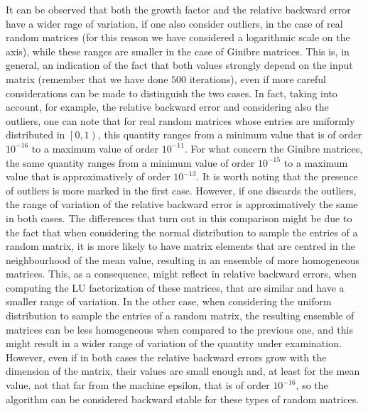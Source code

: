 \documentclass[a4paper,11pt]{report}
\begin{document}
\noindent It can be observed that both the growth factor and the relative backward error have a wider rage of variation, if one also consider outliers, in the case of real random matrices (for this reason we have considered a logarithmic scale on the axis), while these ranges are smaller in the case of Ginibre matrices. This is, in general, an indication of the fact that both values strongly depend on the input matrix (remember that we have done $500$ iterations), even if more careful considerations can be made to distinguish the two cases. In fact, taking into account, for example, the relative backward error and considering also the outliers, one can note that for real random matrices whose entries are uniformly distributed in $\left[0,1\right)$, this quantity ranges from a minimum value that is of order $10^{-16}$ to a maximum value of order $10^{-11}$. For what concern the Ginibre matrices, the same quantity ranges from a minimum value of order $10^{-15}$ to a maximum value that is approximatively of order $10^{-13}$. It is worth noting that the presence of outliers is more marked in the first case. However, if one discards the outliers, the range of variation of the relative backward error is approximatively the same in both cases. The differences that turn out in this comparison might be due to the fact that when considering the normal distribution to sample the entries of a random matrix, it is more likely to have matrix elements that are centred in the neighbourhood of the mean value, resulting in an ensemble of more homogeneous matrices. This, as a consequence, might reflect in relative backward errors, when computing the LU factorization of these matrices, that are similar and have a smaller range of variation. In the other case, when considering the uniform distribution to sample the entries of a random matrix, the resulting ensemble of matrices can be less homogeneous when compared to the previous one, and this might result in a wider range of variation of the quantity under examination. However, even if in both cases the relative backward errors grow with the dimension of the matrix, their values are small enough and, at least for the mean value, not that far from the machine epsilon, that is of order $10^{-16}$, so the algorithm can be considered backward stable for these types of random matrices.
\end{document}
